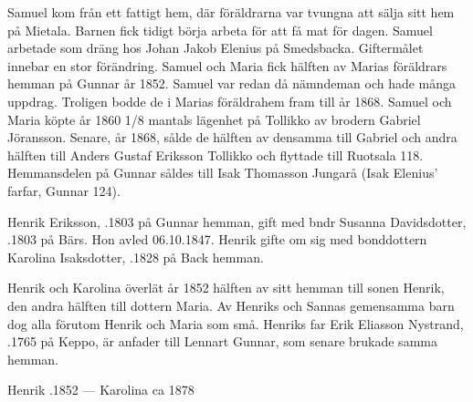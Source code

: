 Samuel kom från ett fattigt hem, där föräldrarna var tvungna att sälja sitt hem på Mietala. Barnen fick tidigt börja arbeta för att få mat för dagen. Samuel arbetade som dräng hos Johan Jakob Elenius på Smedsbacka.	Giftermålet innebar en stor förändring. Samuel och	Maria fick hälften av Marias föräldrars hemman på Gunnar år 1852. Samuel var redan då nämndeman och hade många uppdrag. Troligen bodde de i Marias föräldrahem fram till år 1868. Samuel och Maria köpte år 1860  1/8 mantals lägenhet på Tollikko av brodern Gabriel Jöransson. Senare, år 1868, sålde de hälften av densamma till 	Gabriel och andra hälften till Anders Gustaf Eriksson Tollikko och flyttade  till Ruotsala 118. Hemmansdelen på Gunnar såldes till Isak Thomasson Jungarå (Isak Elenius' farfar, Gunnar 124).


Henrik Eriksson, .1803 på Gunnar hemman, gift med bndr Susanna Davidsdotter, .1803 på Bärs. Hon avled 06.10.1847. Henrik gifte om sig med bonddottern Karolina Isaksdotter, .1828 på Back hemman.
\begin{jhchildren}
  \item {}
  \item {}
  \item {}
  \item {}
  \item {}
  \item {}
  \item {}
  \item {}
  \item {}
\end{jhchildren}

Henrik och Karolina överlät år 1852 hälften av sitt hemman till sonen Henrik, den andra hälften till dottern Maria. Av Henriks och Sannas gemensamma barn dog alla förutom Henrik och Maria som små. Henriks far Erik Eliasson Nystrand, .1765 på Keppo, är anfader till Lennart Gunnar, som senare brukade samma hemman.

Henrik .1852  ---  Karolina \textdied ca 1878



